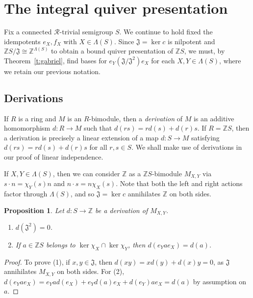 \documentclass[reqno,11pt]{amsart}
\newcommand{\Tor}{\mathop{\mathrm{Tor}}\nolimits}
\newtheorem{Prop}[Thm]{Proposition}
\numberwithin{equation}{section}
\begin{document}
\section{The integral quiver presentation}
Fix a connected $\mathscr R$-trivial semigroup $S$.   We continue to hold fixed the idempotents $e_X,f_X$ with $X\in \Lambda(S)$.  Since $\mathfrak J=\ker c$ is nilpotent and $\mathbb ZS/\mathfrak J\cong \mathbb Z^{\Lambda(S)}$ to obtain a bound quiver presentation of $\mathbb ZS$, we must, by Theorem~\ref{t:gabriel}, find bases for $e_Y(\mathfrak J/\mathfrak J^2)e_X$ for each $X,Y\in \Lambda(S)$, where we retain our previous notation.

\subsection{Derivations}
If $R$ is a ring and $M$ is an $R$-bimodule, then a \emph{derivation} of $M$ is an additive homomorphism $d\colon R\to M$ such that $d(rs) = rd(s)+d(r)s$.  If $R=\mathbb ZS$, then a derivation is precisely a linear extension of a map $d\colon S\to M$ satisfying $d(rs) = rd(s)+d(r)s$ for all $r,s\in S$.  We shall make use of derivations in our proof of linear independence.

If $X,Y\in \Lambda(S)$, then we can consider $\mathbb Z$ as a $\mathbb ZS$-bimodule $M_{X,Y}$ via $s\cdot n = \chi_Y(s)n$ and $n\cdot s = n\chi_X(s)$.  Note that both the left and right actions factor through $\Lambda(S)$, and so $\mathfrak J=\ker c$ annihilates $\mathbb Z$ on both sides. 

\begin{Prop}\label{p:annihilate}
    Let $d\colon S\to \mathbb Z$ be a derivation of $M_{X,Y}$.  
    \begin{enumerate}
        \item  $d(\mathfrak J^2)=0$.
        \item If $a\in \mathbb ZS$ belongs to $\ker \chi_X\cap \ker \chi_Y$, then $d(e_Yae_X) = d(a)$.
    \end{enumerate}   
\end{Prop}
\begin{proof}
    To prove (1), if $x,y\in \mathfrak J$, then $d(xy) = xd(y)+d(x)y = 0$, as $\mathfrak J$ annihilates $M_{X,Y}$ on both sides.  For (2), $d(e_Yae_X) = e_Yad(e_X)+e_Yd(a)e_X+d(e_Y)ae_X = d(a)$ by assumption on $a$.
\end{proof}
\end{document}
